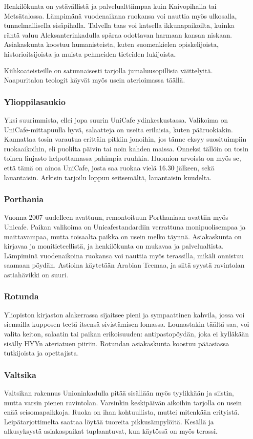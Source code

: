 \documentclass[../ala_hataile.tex]{subfiles}
\begin{document}
Henkilökunta on ystävällistä
ja palvelualttiimpaa kuin Kaivopihalla
tai Metsätalossa. Lämpimänä vuodenaikana
ruokansa voi nauttia myös ulkosalla,
tunnelmallisella sisäpihalla. Talvella taas
voi katsella ikkunapaikoilta, kuinka räntä
valuu Aleksanterinkadulla spåraa odottavan
harmaan kansan niskaan. Asiakaskunta
koostuu humanisteista, kuten suomenkielen
opiskelijoista, historioitsijoista ja muista pehmeiden tieteiden lukijoista.

Kiihkoateisteille on satunnaisesti tarjolla
jumaluusopillisia väittelyitä. Naapuritalon
teologit käyvät myös usein aterioimassa
täällä.
\subsubsection*{Ylioppilasaukio}
Yksi suurimmista, ellei jopa suurin
UniCafe ydinkeskustassa. Valikoima on
UniCafe-mittapuulla hyvä, salaatteja on
useita erilaisia, kuten pääruokiakin. Kannattaa
tosin varautua erittäin pitkiin jonoihin,
jos tänne eksyy suosituimpiin ruokaaikoihin,
eli puolilta päivin tai noin kahden
maissa. Onneksi tällöin on tosin toinen
linjasto helpottamassa pahimpia ruuhkia.
Huomion arvoista on myös se, että tämä on
ainoa UniCafe, josta saa ruokaa vielä 16.30
jälkeen, sekä lauantaisin. Arkisin tarjoilu
loppuu seitsemältä, lauantaisin kuudelta.
\subsubsection*{Porthania}
Vuonna 2007 uudelleen avattuun, remontoituun
Porthaniaan avattiin myös
Unicafe. Paikan valikoima on Unicafestandardiin
verrattuna monipuolisempaa
ja maittavampaa, mutta toisaalta paikka on
usein melko täynnä. Asiakaskunta on kirjavaa
ja monitieteellistä, ja henkilökunta on
mukavaa ja palvelualtista. Lämpiminä vuodenaikoina
ruokansa voi nauttia myös terassilla,
mikäli onnistuu saamaan pöydän.
Astioina käytetään Arabian Teemaa, ja siitä
syystä ravintolan astiahävikki on suuri.
\subsubsection*{Rotunda}
Yliopiston kirjaston alakerrassa sijaitsee
pieni ja sympaattinen kahvila, jossa voi siemailla
kupposen teetä itsensä sivistämisen
lomassa. Lounastakin täältä saa, voi valita
keiton, salaatin tai paikan erikoisuuden:
antipastopöydän, joka ei kylläkään sisälly
HYYn ateriatuen piiriin. Rotundan asiakaskunta
koostuu pääasiassa tutkijoista ja
opettajista.
\subsubsection*{Valtsika}
Valtsikan rakennus Unioninkadulla pitää
sisällään myös tyylikkään ja siistin, mutta
varsin pienen ravintolan. Varsinkin keskipäivän
aikoihin tarjolla on usein enää seisomapaikkoja.
Ruoka on ihan kohtuullista,
muttei mitenkään erityistä. Leipätarjottimelta
saattaa löytää tuoreita pikkusämpylöitä.
Kesällä ja alkusyksystä asiakaspaikat
tuplaantuvat, kun käytössä on myös terassi.
\end{document}
